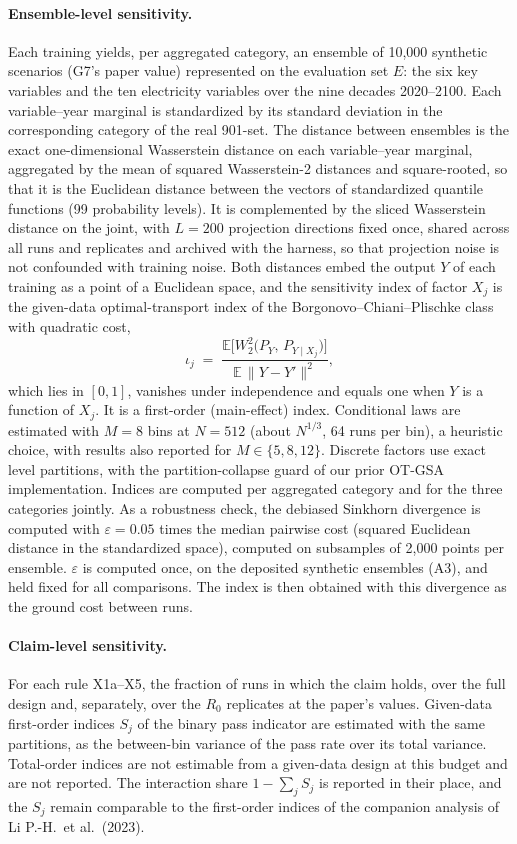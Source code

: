 \documentclass[11pt,a4paper]{article}
\newcommand{\prop}[1]{#1}
\newcommand{\prop}[1]{\textcolor{blue}{#1}}
\begin{document}
\paragraph{Ensemble-level sensitivity.} Each training yields, per
aggregated category, an ensemble of 10{,}000 synthetic scenarios
\prop{(G7's paper value) represented on the evaluation set $E$: the six key
variables and the ten electricity variables over the nine decades
2020--2100.} Each variable--year marginal is standardized by its standard
deviation in \prop{the corresponding category of} the real 901-set. The
distance between ensembles is the exact one-dimensional Wasserstein
distance on each variable--year marginal, aggregated by the mean \prop{of
squared Wasserstein-2 distances and square-rooted, so that it is the
Euclidean distance between the vectors of standardized quantile functions
(99 probability levels)}. It is complemented by the sliced Wasserstein
distance on the joint, with $L=200$ projection directions fixed once,
shared across all runs and replicates \prop{and archived with the
harness}, so that projection noise is not confounded with training noise.
\prop{Both distances embed the output $Y$ of each training as a point of a
Euclidean space, and the sensitivity index of factor $X_j$ is the
given-data optimal-transport index of the Borgonovo--Chiani--Plischke class
with quadratic cost,
\[
\iota_j \;=\; \frac{\mathbb{E}\big[W_2^2\big(P_Y,\,P_{Y\mid X_j}\big)\big]}
{\mathbb{E}\,\lVert Y-Y'\rVert^2},
\]
which lies in $[0,1]$, vanishes under independence and equals one when $Y$
is a function of $X_j$. It is a first-order (main-effect) index.}
Conditional laws are estimated with $M=8$ bins at $N=512$ (about
$N^{1/3}$, 64 runs per bin), a heuristic choice, with results also
reported for $M\in\{5,8,12\}$. Discrete factors use exact level
partitions, with the partition-collapse guard of our prior OT-GSA
implementation. \prop{Indices are computed per aggregated category and for
the three categories jointly.} As a robustness check, the \prop{debiased}
Sinkhorn divergence is computed with $\varepsilon = 0.05$ times the median
pairwise cost (squared Euclidean distance in the standardized space),
computed on subsamples of 2{,}000 points per ensemble. \prop{$\varepsilon$ is
computed once, on the deposited synthetic ensembles (A3), and held fixed
for all comparisons. The index is then obtained with this divergence as
the ground cost between runs.}

\paragraph{Claim-level sensitivity.} For each rule X1a--X5, the fraction of
runs in which the claim holds, \prop{over the full design and, separately,
over the $R_0$ replicates at the paper's values. Given-data first-order
indices $S_j$ of the binary pass indicator are estimated with the same
partitions, as the between-bin variance of the pass rate over its total
variance. Total-order indices are not estimable from a given-data design at
this budget and are not reported. The interaction share $1-\sum_j S_j$ is
reported in their place, and the $S_j$ remain comparable to the first-order
indices of the companion analysis of Li P.-H.\ et al.\ (2023).}
\end{document}
